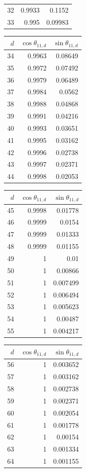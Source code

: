 {\begin{tabular}[t]{r|rr}
32 & 0.9933 & 0.1152 \\
33 & 0.995 & 0.09983
\end{tabular}\kern4pt
\begin{tabular}[t]{r|rr}
$d$ & $\cos\theta_{11,d}$ & $\sin\theta_{11,d}$ \\\hline
34 & 0.9963 & 0.08649 \\
35 & 0.9972 & 0.07492 \\
36 & 0.9979 & 0.06489 \\
37 & 0.9984 & 0.0562 \\
38 & 0.9988 & 0.04868 \\
39 & 0.9991 & 0.04216 \\
40 & 0.9993 & 0.03651 \\
41 & 0.9995 & 0.03162 \\
42 & 0.9996 & 0.02738 \\
43 & 0.9997 & 0.02371 \\
44 & 0.9998 & 0.02053
\end{tabular}\kern4pt
\begin{tabular}[t]{r|rr}
$d$ & $\cos\theta_{11,d}$ & $\sin\theta_{11,d}$ \\\hline
45 & 0.9998 & 0.01778 \\
46 & 0.9999 & 0.0154 \\
47 & 0.9999 & 0.01333 \\
48 & 0.9999 & 0.01155 \\
49 & 1 & 0.01 \\
50 & 1 & 0.00866 \\
51 & 1 & 0.007499 \\
52 & 1 & 0.006494 \\
53 & 1 & 0.005623 \\
54 & 1 & 0.00487 \\
55 & 1 & 0.004217
\end{tabular}\kern4pt
\begin{tabular}[t]{r|rr}
$d$ & $\cos\theta_{11,d}$ & $\sin\theta_{11,d}$ \\\hline
56 & 1 & 0.003652 \\
57 & 1 & 0.003162 \\
58 & 1 & 0.002738 \\
59 & 1 & 0.002371 \\
60 & 1 & 0.002054 \\
61 & 1 & 0.001778 \\
62 & 1 & 0.00154 \\
63 & 1 & 0.001334 \\
64 & 1 & 0.001155
\end{tabular}}

